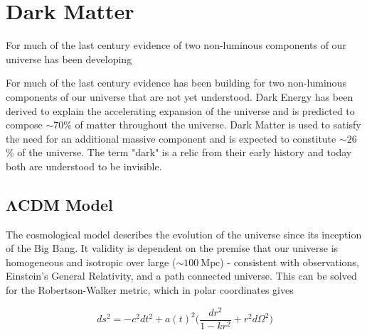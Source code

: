 




\pagestyle{cu}
\graphicspath{{./Chapter1/Figures/}}
\chapter[Dark Matter][Dark Matter]{Dark Matter}
\label{chap:dark_matter}

For much of the last century evidence of two non-luminous components of our universe has been developing

For much of the last century evidence has been building for two non-luminous components of our universe that are not yet understood.
Dark Energy has been derived to explain the accelerating expansion of the universe and is predicted to compose $\sim70$\% of
matter throughout the universe.  Dark Matter is used to satisfy the need for an additional massive component and is expected to
constitute $\sim26$ \% of the universe.  The term "dark" is a relic from their early history and today both are understood to be
invisible.



\section[$\Lambda$ CDM Model][$\Lambda$ CDM Model]{$\boldsymbol{\Lambda}$CDM Model}
The cosmological model describes the evolution of the universe since its inception of the Big Bang.  It validity is dependent
on the premise that our universe is homogeneous and isotropic over large ($\sim 100\ \mathrm{Mpc}$) - consistent with observations,
Einstein's General Relativity, and a path connected universe.  This can be solved for the Robertson-Walker metric, which in
polar coordinates gives

\begin{equation}
ds^{2} = -c^{2}dt^{2} + a(t)^{2} \bigg( \frac{dr^{2}}{1 - kr^{2}} + r^{2}d\Omega^{2} \bigg)
\end{equation}

